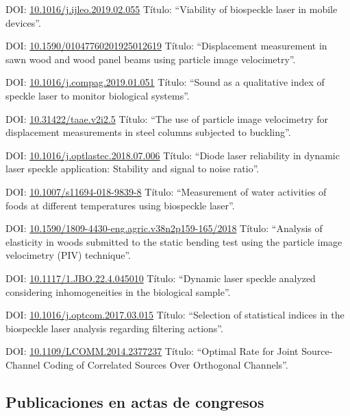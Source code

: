 \documentclass[11pt,a4paper,sans]{moderncv} %
\newcommand{\doiurl}[1]{\href{https://doi.org/#1}{#1}}
\begin{document}
	      {DOI: \doiurl{10.1016/j.ijleo.2019.02.055}}{}{}
	      {Título: ``Viability of biospeckle laser in mobile devices''.}

	      {DOI: \doiurl{10.1590/01047760201925012619}}{}{}
	      {Título: ``Displacement measurement in sawn wood and wood panel beams using particle image velocimetry''.}

	      {DOI: \doiurl{10.1016/j.compag.2019.01.051}}{}{}
	      {Título: ``Sound as a qualitative index of speckle laser to monitor biological systems''.}

	      {DOI: \doiurl{10.31422/taae.v2i2.5}}{}{}
	      {Título: ``The use of particle image velocimetry for displacement measurements in steel columns subjected to buckling''.}
	      
	      {DOI: \doiurl{10.1016/j.optlastec.2018.07.006}}{}{}
	      {Título: ``Diode laser reliability in dynamic laser speckle application: Stability and signal to noise ratio''.}
	      
	      {DOI: \doiurl{10.1007/s11694-018-9839-8}}{}{}
	      {Título: ``Measurement of water activities of foods at different temperatures using biospeckle laser''.}

	      {DOI: \doiurl{10.1590/1809-4430-eng.agric.v38n2p159-165/2018}}{}{}
	      {Título: ``Analysis of elasticity in woods submitted to the static bending test using the particle image velocimetry (PIV) technique''.}

	      {DOI: \doiurl{10.1117/1.JBO.22.4.045010}}{}{}
	      {Título: ``Dynamic laser speckle analyzed considering inhomogeneities in the biological sample''.}
	      
	      {DOI: \doiurl{10.1016/j.optcom.2017.03.015}}{}{}
	      {Título: ``Selection of statistical indices in the biospeckle laser analysis regarding filtering actions''.}
	      
	      {DOI: \doiurl{10.1109/LCOMM.2014.2377237}}{}{}
	      {Título: ``Optimal  Rate for Joint Source-Channel Coding of Correlated Sources Over Orthogonal Channels''.}

\subsection{Publicaciones en actas de congresos}
\end{document}

